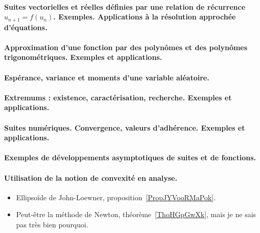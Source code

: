 \paragraph{Suites vectorielles et réelles définies par une relation de récurrence \( u_{n+1}=f(u_n)\). Exemples. Applications à la résolution approchée d'équations.}
\paragraph{Approximation d'une fonction par des polynômes et des polynômes trigonométriques. Exemples et applications.}
\paragraph{Espérance, variance et moments d'une variable aléatoire.}
\paragraph{Extremums : existence, caractérisation, recherche. Exemples et applications.}
\paragraph{Suites numériques. Convergence, valeurs d'adhérence. Exemples et applications.}
\paragraph{Exemples de développements asymptotiques de suites et de fonctions.}
\paragraph{Utilisation de la notion de convexité en analyse.}
\begin{itemize}
    \item Ellipsoïde de John-Loewner, proposition~\ref{PropJYVooRMaPok}.
    \item Peut-être la méthode de Newton, théorème~\ref{ThoHGpGwXk}, mais je ne sais pas très bien pourquoi.
\end{itemize}
